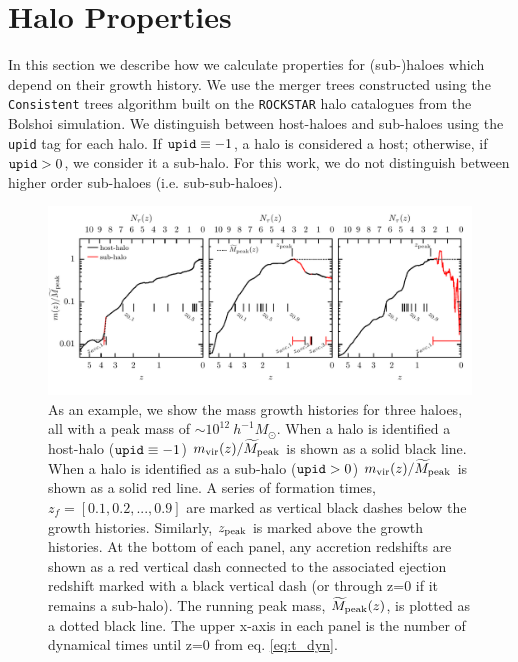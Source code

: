 \documentclass[useAMS,fleqn,usenatbib]{mnras}
\begin{document}

 

\appendix

\section{Halo Properties}
\label{sec:halo_properties}

In this section we describe how we calculate properties for (sub-)haloes which depend on their growth history.  We use the merger trees constructed using the {\tt Consistent} trees algorithm \citep{Behroozi:2013dz} built on the {\tt ROCKSTAR} halo catalogues from the Bolshoi simulation.  We distinguish between host-haloes and sub-haloes using the {\tt upid} tag for each halo.  If $ {\tt upid} \equiv -1$, a halo is considered a host; otherwise, if ${\tt upid} > 0$, we consider it a sub-halo.  For this work, we do not distinguish between higher order sub-haloes (i.e. sub-sub-haloes).

\begin{figure}
    \includegraphics[width=\textwidth]{figures/growth_hist.pdf}
    \caption{As an example, we show the mass growth histories for three haloes, all with a peak mass of $\sim 10^{12}~h^{-1}M_{\odot}$.  When a halo is identified a host-halo (${\tt upid} \equiv -1$) $m_{\rm vir}(z)/\widetilde{M}_{\rm peak}$ is shown as a solid black line.  When a halo is identified as a sub-halo (${\tt upid} > 0$) $m_{\rm vir}(z)/\widetilde{M}_{\rm peak}$ is shown as a solid red line.  A series of formation times, $z_{f} = [0.1,0.2,...,0.9]$ are marked as vertical black dashes below the growth histories.  Similarly, $z_{\rm peak}$ is marked above the growth histories.  At the bottom of each panel, any accretion redshifts are shown as a red vertical dash connected to the associated ejection redshift marked with a black vertical dash (or through z=0 if it remains a sub-halo).  The running peak mass, $\widetilde{M}_{\rm peak}(z)$, is plotted as a dotted black line.  The upper x-axis in each panel is the number of dynamical times until z=0 from eq. \ref{eq:t_dyn}.}
    \label{fig:growth_hist}
\end{figure}
\end{document}
